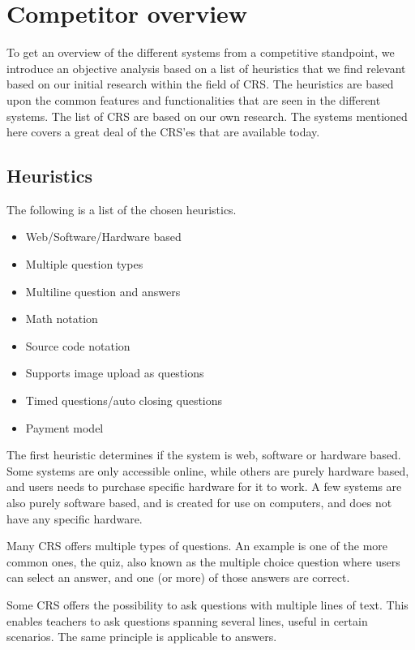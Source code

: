 \section{Competitor overview}
To get an overview of the different systems from a competitive standpoint, we introduce an objective analysis based on a list of heuristics that we find relevant based on our initial research within the field of CRS. The heuristics are based upon the common features and functionalities that are seen in the different systems. The list of CRS are based on our own research. The systems mentioned here covers a great deal of the CRS'es that are available today.

\subsection{Heuristics}

The following is a list of the chosen heuristics.

\begin{itemize}
    \item Web/Software/Hardware based
    \item Multiple question types
    \item Multiline question and answers
    \item Math notation
    \item Source code notation
    \item Supports image upload as questions
    \item Timed questions/auto closing questions
    \item Payment model
\end{itemize}

The first heuristic determines if the system is web, software or hardware based. Some systems are only accessible online, while others are purely hardware based, and users needs to purchase specific hardware for it to work. A few systems are also purely software based, and is created for use on computers, and does not have any specific hardware.

Many CRS offers multiple types of questions. An example is one of the more common ones, the quiz, also known as the multiple choice question where users can select an answer, and one (or more) of those answers are correct.

Some CRS offers the possibility to ask questions with multiple lines of text. This enables teachers to ask questions spanning several lines, useful in certain scenarios. The same principle is applicable to answers.

